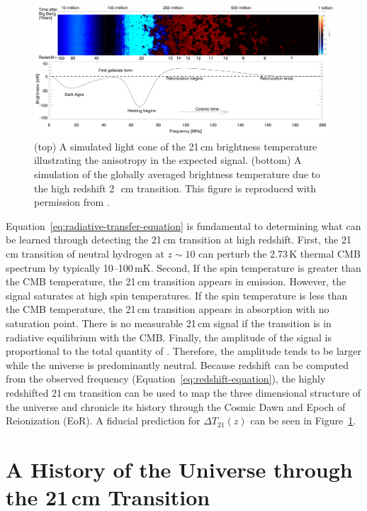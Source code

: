 \begin{bibunit}
\begin{figure}[t]
    \centering
    \includegraphics[width=\textwidth]{figures/chapter1/pritchard-2012-global-signal}
    \caption{
        (top) A simulated light cone of the 21\,cm brightness temperature illustrating the
        anisotropy in the expected signal.
        (bottom) A simulation of the globally averaged brightness temperature due to the high
        redshift 2\,~cm transition.
        This figure is reproduced with permission from \citet{2012RPPh...75h6901P}.
    }
    \label{fig:pritchard-global-signal}
\end{figure}

Equation~\ref{eq:radiative-transfer-equation} is fundamental to determining what can be learned
through detecting the 21\,cm transition at high redshift. First, the 21\,cm transition of neutral
hydrogen at $z\sim 10$ can perturb the 2.73\,K thermal CMB spectrum by typically 10--100\,mK.
Second, If the spin temperature is greater than the CMB temperature, the 21\,cm transition appears
in emission. However, the signal saturates at high spin temperatures. If the spin temperature is
less than the CMB temperature, the 21\,cm transition appears in absorption with no saturation point.
There is no measurable 21\,cm signal if the transition is in radiative equilibrium with the CMB.
Finally, the amplitude of the signal is proportional to the total quantity of . Therefore,
the amplitude tends to be larger while the universe is predominantly neutral.  Because redshift can
be computed from the observed frequency (Equation~\ref{eq:redshift-equation}), the highly redshifted
21\,cm transition can be used to map the three dimensional structure of the universe and chronicle
its history through the Cosmic Dawn and Epoch of Reionization (EoR).  A fiducial prediction for
$\Delta T_{21}(z)$ can be seen in Figure~\ref{fig:pritchard-global-signal}.

\section{A History of the Universe through the 21\,cm Transition}


\end{bibunit}
